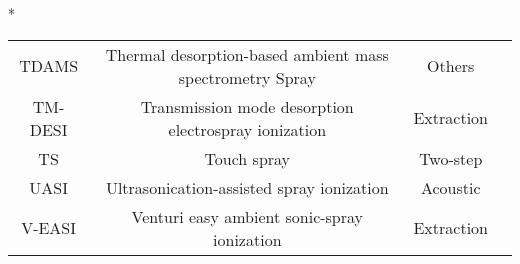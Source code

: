 \begin{table}{*}
\begin{tabular}{|c|c|c|l|}
        TDAMS & Thermal desorption-based ambient mass spectrometry Spray & Others & \cite{20721383} \\
        TM-DESI & Transmission mode desorption electrospray ionization & Extraction & \cite{18684639} \\
        TS & Touch spray & Two-step & \cite{24756256} \\
        UASI & Ultrasonication-assisted spray ionization & Acoustic & \cite{20957254} \\
        V-EASI & Venturi easy ambient sonic-spray ionization & Extraction & \cite{21235233} \\
    \hline \hline 
    \end{tabular} 
\end{table}